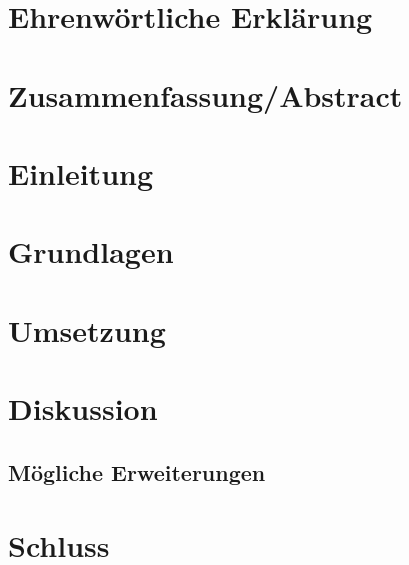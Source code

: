 \documentclass[12pt]{scrartcl}
\begin{document}
\begin{onehalfspacing}
  \section*{Ehrenwörtliche Erklärung}
  
  \newpage
  \section*{Zusammenfassung/Abstract}
  
  \newpage
  \section{Einleitung}
  
  \section{Grundlagen}
  
  \section{Umsetzung}
  
  \section{Diskussion}
  
  \subsection{Mögliche Erweiterungen}\label{sec:Erweiterungen}
  \section{Schluss}
  
  \printbibliography
\end{onehalfspacing}
\end{document}
